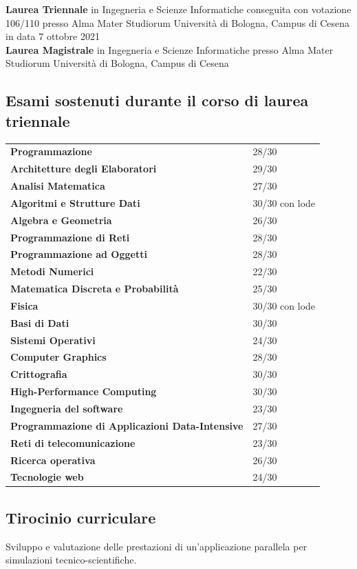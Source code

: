 \documentclass{article}
\newcommand{\years}[1]{\marginnote{\small #1}} %
\begin{document}
	\years{2018-2021} \textbf{Laurea Triennale} in Ingegneria e Scienze Informatiche conseguita con votazione 106/110 presso Alma Mater Studiorum Università di Bologna, Campus di Cesena in data 7 ottobre 2021\\
	
	\years{2021-oggi} \textbf{Laurea Magistrale} in Ingegneria e Scienze Informatiche presso Alma Mater Studiorum Università di Bologna, Campus di Cesena
	
	\subsection*{Esami sostenuti durante il corso di laurea triennale}
	\begin{tabular}{ll}
		\textbf{Programmazione} & 28/30\\
		\textbf{Architetture degli Elaboratori} & 29/30\\
		\textbf{Analisi Matematica} & 27/30\\
		\textbf{Algoritmi e Strutture Dati} & 30/30 con lode\\
		\textbf{Algebra e Geometria} & 26/30\\
		\textbf{Programmazione di Reti} & 28/30\\
		\textbf{Programmazione ad Oggetti} & 28/30\\
		\textbf{Metodi Numerici} & 22/30\\
		\textbf{Matematica Discreta e Probabilità} & 25/30\\
		\textbf{Fisica} & 30/30 con lode\\
		\textbf{Basi di Dati} & 30/30\\
		\textbf{Sistemi Operativi} & 24/30\\
		\textbf{Computer Graphics} & 28/30\\
		\textbf{Crittografia} & 30/30\\
		\textbf{High-Performance Computing} & 30/30\\
		\textbf{Ingegneria del software} & 23/30\\
		\textbf{Programmazione di Applicazioni Data-Intensive} & 27/30\\
		\textbf{Reti di telecomunicazione} & 23/30\\
		\textbf{Ricerca operativa} & 26/30\\
		\textbf{Tecnologie web} & 24/30\\
	\end{tabular}

	\subsection*{Tirocinio curriculare}
	Sviluppo e valutazione delle prestazioni di un'applicazione parallela per simulazioni tecnico-scientifiche.
	
\end{document}
